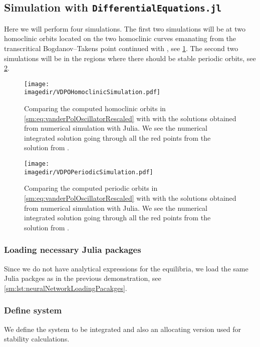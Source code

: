 \subsection{Simulation with {\tt DifferentialEquations.jl}}
Here we will perform four simulations. The first two simulations will be at two
homoclinic orbits located on the two homoclinic curves emanating from the
transcritical Bogdanov--Takens point continued with \DDEBIFTOOL, see
\cref{sm:fig:VDPOSimulationHomoclinic}. The second two simulations will be in
the regions where there should be stable periodic orbits, see
\cref{sm:fig:VDPOPeriodicSimulation}.

\begin{figure}[ht]
    \centering
    \texttt{[image: \\imagedir/VDPOHomoclinicSimulation.pdf]}
    \caption{Comparing the computed homoclinic orbits in \cref{sm:eq:vanderPolOscillatorRescaled}
    with \DDEBIFTOOL with the solutions obtained from numerical simulation with Julia.
    We see the numerical integrated solution
    going through all the red points from the solution from \DDEBIFTOOL.}
    \label{sm:fig:VDPOSimulationHomoclinic}
\end{figure}

\begin{figure}[ht]
    \centering
    \texttt{[image: \\imagedir/VDPOPeriodicSimulation.pdf]}
    \caption{Comparing the computed periodic orbits in \cref{sm:eq:vanderPolOscillatorRescaled}
    with \DDEBIFTOOL with the solutions obtained from numerical simulation with Julia.
    We see the numerical integrated solution
    going through all the red points from the solution from \DDEBIFTOOL.}
    \label{sm:fig:VDPOPeriodicSimulation}
\end{figure}

\subsubsection{Loading necessary Julia packages}
Since we do not have  analytical expressions for the equilibria, we load the
same Julia packges as in the previous demonstration, see
\cref{sm:lst:neuralNetworkLoadingPacakges}.

\subsubsection{Define system}
We define the system to be integrated and also an allocating version used for
stability calculations.
\inputminted[firstline=8, lastline=30]{julia}{\pathToJuliaFiles/vdpo_simulation_article.jl}

